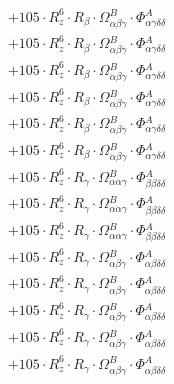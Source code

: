 \documentclass{article}
\begin{document}
\begin{subequations}
\begin{gather}
\begin{array}{c}
 \\[0.2em] 		 + 105 \cdot R_{z}^{6} \cdot R_{\beta{}} \cdot \Omega{}^{B}_{\alpha{}\beta{}\gamma{}} \cdot \Phi{}^{A}_{\alpha{}\gamma{}\delta{}\delta{}} 
 \\[0.2em] 		 + 105 \cdot R_{z}^{6} \cdot R_{\beta{}} \cdot \Omega{}^{B}_{\alpha{}\beta{}\gamma{}} \cdot \Phi{}^{A}_{\alpha{}\gamma{}\delta{}\delta{}} 
 \\[0.2em] 		 + 105 \cdot R_{z}^{6} \cdot R_{\beta{}} \cdot \Omega{}^{B}_{\alpha{}\beta{}\gamma{}} \cdot \Phi{}^{A}_{\alpha{}\gamma{}\delta{}\delta{}} 
 \\[0.2em] 		 + 105 \cdot R_{z}^{6} \cdot R_{\beta{}} \cdot \Omega{}^{B}_{\alpha{}\beta{}\gamma{}} \cdot \Phi{}^{A}_{\alpha{}\gamma{}\delta{}\delta{}} 
 \\[0.2em] 		 + 105 \cdot R_{z}^{6} \cdot R_{\beta{}} \cdot \Omega{}^{B}_{\alpha{}\beta{}\gamma{}} \cdot \Phi{}^{A}_{\alpha{}\gamma{}\delta{}\delta{}} 
 \\[0.2em] 		 + 105 \cdot R_{z}^{6} \cdot R_{\beta{}} \cdot \Omega{}^{B}_{\alpha{}\beta{}\gamma{}} \cdot \Phi{}^{A}_{\alpha{}\gamma{}\delta{}\delta{}} 
 \\[0.2em] 		 + 105 \cdot R_{z}^{6} \cdot R_{\gamma{}} \cdot \Omega{}^{B}_{\alpha{}\alpha{}\gamma{}} \cdot \Phi{}^{A}_{\beta{}\beta{}\delta{}\delta{}} 
 \\[0.2em] 		 + 105 \cdot R_{z}^{6} \cdot R_{\gamma{}} \cdot \Omega{}^{B}_{\alpha{}\alpha{}\gamma{}} \cdot \Phi{}^{A}_{\beta{}\beta{}\delta{}\delta{}} 
 \\[0.2em] 		 + 105 \cdot R_{z}^{6} \cdot R_{\gamma{}} \cdot \Omega{}^{B}_{\alpha{}\alpha{}\gamma{}} \cdot \Phi{}^{A}_{\beta{}\beta{}\delta{}\delta{}} 
 \\[0.2em] 		 + 105 \cdot R_{z}^{6} \cdot R_{\gamma{}} \cdot \Omega{}^{B}_{\alpha{}\beta{}\gamma{}} \cdot \Phi{}^{A}_{\alpha{}\beta{}\delta{}\delta{}} 
 \\[0.2em] 		 + 105 \cdot R_{z}^{6} \cdot R_{\gamma{}} \cdot \Omega{}^{B}_{\alpha{}\beta{}\gamma{}} \cdot \Phi{}^{A}_{\alpha{}\beta{}\delta{}\delta{}} 
 \\[0.2em] 		 + 105 \cdot R_{z}^{6} \cdot R_{\gamma{}} \cdot \Omega{}^{B}_{\alpha{}\beta{}\gamma{}} \cdot \Phi{}^{A}_{\alpha{}\beta{}\delta{}\delta{}} 
 \\[0.2em] 		 + 105 \cdot R_{z}^{6} \cdot R_{\gamma{}} \cdot \Omega{}^{B}_{\alpha{}\beta{}\gamma{}} \cdot \Phi{}^{A}_{\alpha{}\beta{}\delta{}\delta{}} 
 \\[0.2em] 		 + 105 \cdot R_{z}^{6} \cdot R_{\gamma{}} \cdot \Omega{}^{B}_{\alpha{}\beta{}\gamma{}} \cdot \Phi{}^{A}_{\alpha{}\beta{}\delta{}\delta{}} 

\end{array}
\end{gather}
\end{subequations}
\end{document}
